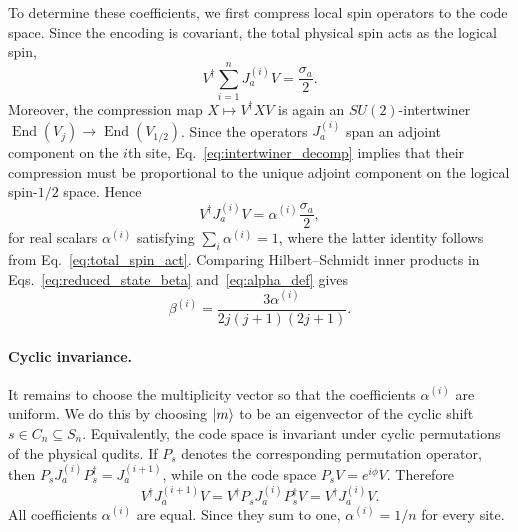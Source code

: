 \documentclass[10pt,twocolumn,superscriptaddress,aps,amsmath,amssymb,citeautoscript,floatfix,prx,longbibliography]{revtex4-2}
\theoremstyle{plain}
\theoremstyle{plain}
\theoremstyle{plain}
\theoremstyle{plain}
\theoremstyle{plain}
\theoremstyle{plain}
\begin{document}
To determine these coefficients, we first compress local spin operators to the code space. Since the encoding is covariant, the total physical spin acts as the logical spin,
\begin{equation}\label{eq:total_spin_act}
    V^\dagger \sum_{i=1}^n J_a^{(i)} V
    =
    \frac{\sigma_a}{2} .
\end{equation}
Moreover, the compression map $X\mapsto V^\dagger X V$ is again an $SU(2)$-intertwiner $\operatorname{End}(V_j)\rightarrow \operatorname{End}(V_{1/2})$. Since the operators $J_a^{(i)}$ span an adjoint component on the $i$th site, Eq.~\eqref{eq:intertwiner_decomp} implies that their compression must be proportional to the unique adjoint component on the logical spin-$1/2$ space. Hence
\begin{equation}\label{eq:alpha_def}
    V^\dagger J_a^{(i)} V
    =
    \alpha^{(i)}\frac{\sigma_a}{2},
\end{equation}
for real scalars $\alpha^{(i)}$ satisfying $\sum_i\alpha^{(i)}=1$, where the latter identity follows from Eq.~\eqref{eq:total_spin_act}. Comparing Hilbert--Schmidt inner products in Eqs.~\eqref{eq:reduced_state_beta} and~\eqref{eq:alpha_def} gives
\begin{equation}\label{eq:beta_through_alpha}
    \beta^{(i)}
    =
    \frac{3\alpha^{(i)}}{2j(j+1)(2j+1)} .
\end{equation}

\paragraph{Cyclic invariance.}
It remains to choose the multiplicity vector so that the coefficients $\alpha^{(i)}$ are uniform. We do this by choosing $\ket m$ to be an eigenvector of the cyclic shift $s\in C_n\subseteq S_n$. Equivalently, the code space is invariant under cyclic permutations of the physical qudits. If $P_s$ denotes the corresponding permutation operator, then $P_s J_a^{(i)}P_s^\dagger=J_a^{(i+1)}$, while on the code space $P_sV=e^{i\phi}V$. Therefore
\[
    V^\dagger J_a^{(i+1)}V
    =
    V^\dagger P_sJ_a^{(i)}P_s^\dagger V
    =
    V^\dagger J_a^{(i)}V .
\]
All coefficients $\alpha^{(i)}$ are equal. Since they sum to one, $\alpha^{(i)}=1/n$ for every site.
\end{document}
